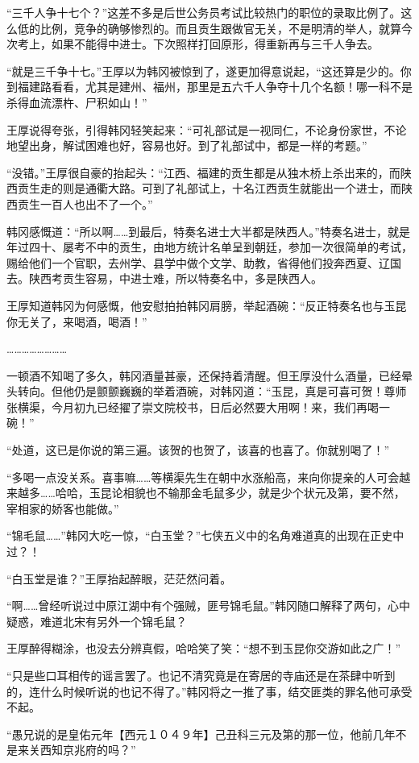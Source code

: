 “三千人争十七个？”这差不多是后世公务员考试比较热门的职位的录取比例了。这么低的比例，竞争的确够惨烈的。而且贡生跟做官无关，不是明清的举人，就算今次考上，如果不能得中进士。下次照样打回原形，得重新再与三千人争去。

“就是三千争十七。”王厚以为韩冈被惊到了，遂更加得意说起，“这还算是少的。你到福建路看看，尤其是建州、福州，那里是五六千人争夺十几个名额！哪一科不是杀得血流漂杵、尸积如山！”

王厚说得夸张，引得韩冈轻笑起来：“可礼部试是一视同仁，不论身份家世，不论地望出身，解试困难也好，容易也好。到了礼部试中，都是一样的考题。”

“没错。”王厚很自豪的抬起头：“江西、福建的贡生都是从独木桥上杀出来的，而陕西贡生走的则是通衢大路。可到了礼部试上，十名江西贡生就能出一个进士，而陕西贡生一百人也出不了一个。”

韩冈感慨道：“所以啊……到最后，特奏名进士大半都是陕西人。”特奏名进士，就是年过四十、屡考不中的贡生，由地方统计名单呈到朝廷，参加一次很简单的考试，赐给他们一个官职，去州学、县学中做个文学、助教，省得他们投奔西夏、辽国去。陕西考贡生容易，中进士难，所以特奏名中，多是陕西人。

王厚知道韩冈为何感慨，他安慰拍拍韩冈肩膀，举起酒碗：“反正特奏名也与玉昆你无关了，来喝酒，喝酒！”

……………………

一顿酒不知喝了多久，韩冈酒量甚豪，还保持着清醒。但王厚没什么酒量，已经晕头转向。但他仍是颤颤巍巍的举着酒碗，对韩冈道：“玉昆，真是可喜可贺！尊师张横渠，今月初九已经擢了崇文院校书，日后必然要大用啊！来，我们再喝一碗！”

“处道，这已是你说的第三遍。该贺的也贺了，该喜的也喜了。你就别喝了！”

“多喝一点没关系。喜事嘛……等横渠先生在朝中水涨船高，来向你提亲的人可会越来越多……哈哈，玉昆论相貌也不输那金毛鼠多少，就是少个状元及第，要不然，宰相家的娇客也能做。”

“锦毛鼠……”韩冈大吃一惊，“白玉堂？”七侠五义中的名角难道真的出现在正史中过？！

“白玉堂是谁？”王厚抬起醉眼，茫茫然问着。

“啊……曾经听说过中原江湖中有个强贼，匪号锦毛鼠。”韩冈随口解释了两句，心中疑惑，难道北宋有另外一个锦毛鼠？

王厚醉得糊涂，也没去分辨真假，哈哈笑了笑：“想不到玉昆你交游如此之广！”

“只是些口耳相传的谣言罢了。也记不清究竟是在寄居的寺庙还是在茶肆中听到的，连什么时候听说的也记不得了。”韩冈将之一推了事，结交匪类的罪名他可承受不起。

“愚兄说的是皇佑元年【西元１０４９年】己丑科三元及第的那一位，他前几年不是来关西知京兆府的吗？”

